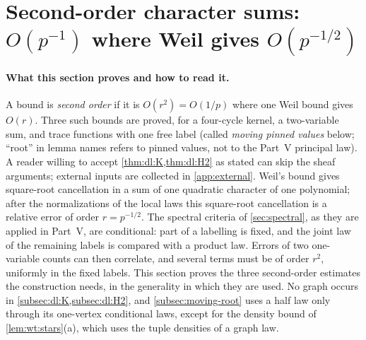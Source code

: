 
\section{Second-order character sums: \texorpdfstring{$O(p^{-1})$}{O(p\textasciicircum (-1))} where Weil gives \texorpdfstring{$O(p^{-1/2})$}{O(p\textasciicircum (-1/2))}}\label{sec:dl}

\paragraph{What this section proves and how to read it.}
A bound is \emph{second order} if it is $O(r^2)=O(1/p)$ where one
Weil bound gives $O(r)$. Three such bounds are proved, for a
four-cycle kernel, a two-variable sum, and trace functions with one
free label (called \emph{moving pinned values} below; ``root'' in
lemma names refers to pinned values, not to the Part~V principal
law). A reader willing to accept \cref{thm:dl:K,thm:dl:H2} as stated
can skip the sheaf arguments; external inputs are collected in
\cref{app:external}.
Weil's bound gives square-root cancellation in a sum of one quadratic
character of one polynomial; after the normalizations of the local
laws this square-root cancellation is a relative error of order
$r=p^{-1/2}$. The spectral criteria of
\cref{sec:spectral}, as they are applied in Part~V, are
conditional: part of a labelling is fixed, and the joint law of the remaining
labels is compared with a product law. Errors of two one-variable counts can
then correlate, and several terms must be of order $r^2$, uniformly in the
fixed labels. This section proves the three second-order estimates the
construction needs, in the generality in which they are used. No graph occurs
in \cref{subsec:dl:K,subsec:dl:H2}, and \cref{subsec:moving-root} uses a half
law only through its one-vertex conditional laws, except for the density bound
of \cref{lem:wt:stars}(a), which uses the tuple densities of a graph law.

